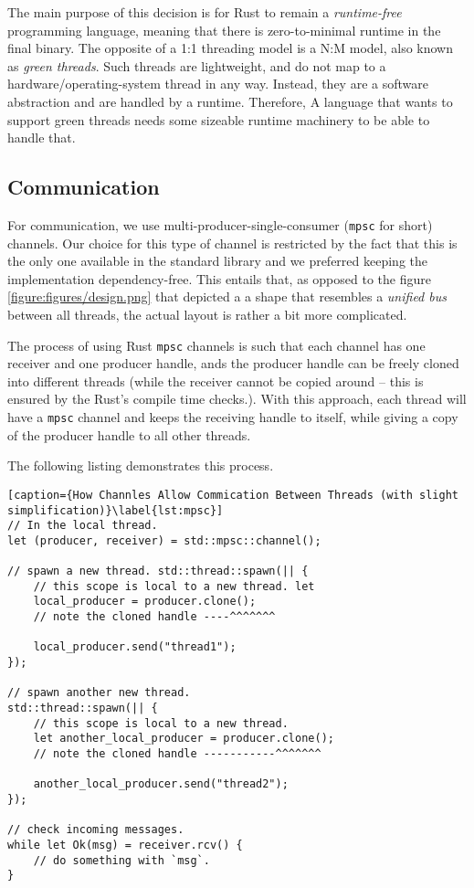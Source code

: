 The main purpose of this decision is for Rust to remain a \textit{runtime-free} programming
language\cite{RustJourneyAsync}, meaning that there is zero-to-minimal runtime in the final binary.
The opposite of a 1:1 threading model is a N:M model, also known as \textit{green threads}. Such
threads are lightweight, and do not map to a hardware/operating-system thread in any way. Instead,
they are a software abstraction and are handled by a runtime. Therefore, A language that wants to
support green threads needs some sizeable runtime machinery to be able to handle that.

\subsection{Communication}

For communication, we use multi-producer-single-consumer\cite{StdSyncMpsc} (\texttt{mpsc} for short)
channels. Our choice for this type of channel is restricted by the fact that this is the only one
available in the standard library and we preferred keeping the implementation dependency-free. This
entails that, as opposed to the figure \ref{figure:figures/design.png} that depicted a a shape that
resembles a \textit{unified bus} between all threads, the actual layout is rather a bit more
complicated.

The process of using Rust \texttt{mpsc} channels is such that each channel has one receiver and one
producer handle, ands the producer handle can be freely cloned into different threads (while the
receiver cannot be copied around -- this is ensured by the Rust's compile time checks.). With this
approach, each thread will have a \texttt{mpsc} channel and keeps the receiving handle to itself,
while giving a copy of the producer handle to all other threads.

The following listing demonstrates this process.

\begin{lstlisting}[caption={How Channles Allow Commication Between Threads (with slight simplification)}\label{lst:mpsc}]
// In the local thread.
let (producer, receiver) = std::mpsc::channel();

// spawn a new thread. std::thread::spawn(|| {
	// this scope is local to a new thread. let
	local_producer = producer.clone();
	// note the cloned handle ----^^^^^^^

	local_producer.send("thread1");
});

// spawn another new thread.
std::thread::spawn(|| {
	// this scope is local to a new thread.
	let another_local_producer = producer.clone();
	// note the cloned handle -----------^^^^^^^

	another_local_producer.send("thread2");
});

// check incoming messages.
while let Ok(msg) = receiver.rcv() {
	// do something with `msg`.
}
\end{lstlisting}


